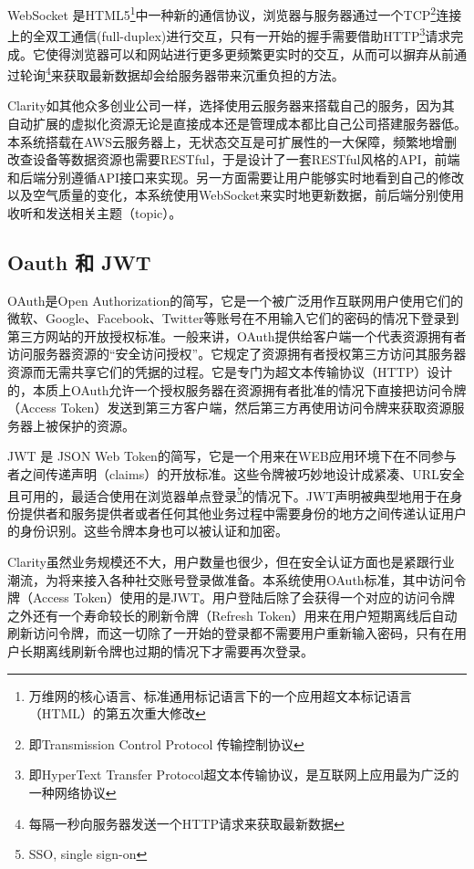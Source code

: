 WebSocket 是HTML5\footnote{万维网的核心语言、标准通用标记语言下的一个应用超文本标记语言（HTML）的第五次重大修改}中一种新的通信协议，浏览器与服务器通过一个TCP\footnote{即Transmission Control Protocol 传输控制协议}连接上的全双工通信(full-duplex)进行交互，只有一开始的握手需要借助HTTP\footnote{即HyperText Transfer Protocol超文本传输协议，是互联网上应用最为广泛的一种网络协议}请求完成。它使得浏览器可以和网站进行更多更频繁更实时的交互，从而可以摒弃从前通过轮询\footnote{每隔一秒向服务器发送一个HTTP请求来获取最新数据}来获取最新数据却会给服务器带来沉重负担的方法。

Clarity如其他众多创业公司一样，选择使用云服务器来搭载自己的服务，因为其自动扩展的虚拟化资源无论是直接成本还是管理成本都比自己公司搭建服务器低。本系统搭载在AWS云服务器上，无状态交互是可扩展性的一大保障，频繁地增删改查设备等数据资源也需要RESTful，于是设计了一套RESTful风格的API，前端和后端分别遵循API接口来实现。另一方面需要让用户能够实时地看到自己的修改以及空气质量的变化，本系统使用WebSocket来实时地更新数据，前后端分别使用收听和发送相关主题（topic）。
\subsection{Oauth 和 JWT}
OAuth是Open Authorization的简写，它是一个被广泛用作互联网用户使用它们的微软、Google、Facebook、Twitter等账号在不用输入它们的密码的情况下登录到第三方网站的开放授权标准。一般来讲，OAuth提供给客户端一个代表资源拥有者访问服务器资源的“安全访问授权”。它规定了资源拥有者授权第三方访问其服务器资源而无需共享它们的凭据的过程。它是专门为超文本传输协议（HTTP）设计的，本质上OAuth允许一个授权服务器在资源拥有者批准的情况下直接把访问令牌（Access Token）发送到第三方客户端，然后第三方再使用访问令牌来获取资源服务器上被保护的资源。\supercite{hardt4rfc6749}

JWT 是 JSON Web Token的简写，它是一个用来在WEB应用环境下在不同参与者之间传递声明（claims）的开放标准。这些令牌被巧妙地设计成紧凑、URL安全且可用的，最适合使用在浏览器单点登录\footnote{SSO, single sign-on}的情况下。JWT声明被典型地用于在身份提供者和服务提供者或者任何其他业务过程中需要身份的地方之间传递认证用户的身份识别。\supercite{bradley2015json}这些令牌本身也可以被认证和加密。

Clarity虽然业务规模还不大，用户数量也很少，但在安全认证方面也是紧跟行业潮流，为将来接入各种社交账号登录做准备。本系统使用OAuth标准，其中访问令牌（Access Token）使用的是JWT。用户登陆后除了会获得一个对应的访问令牌之外还有一个寿命较长的刷新令牌（Refresh Token）用来在用户短期离线后自动刷新访问令牌，而这一切除了一开始的登录都不需要用户重新输入密码，只有在用户长期离线刷新令牌也过期的情况下才需要再次登录。


